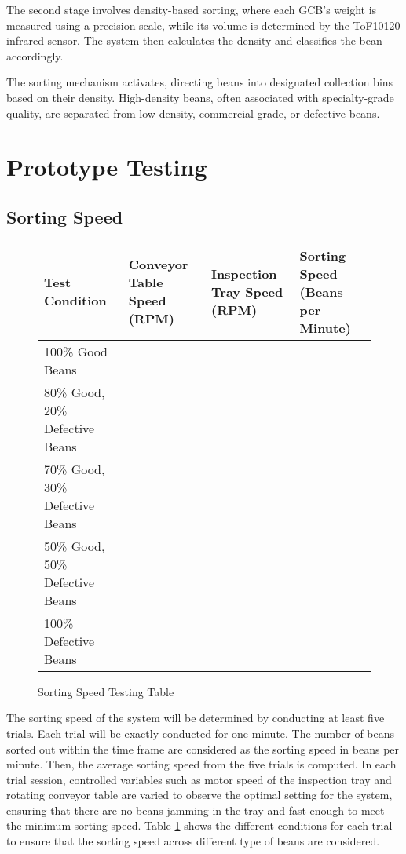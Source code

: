 The second stage involves density-based sorting, where each GCB's weight is measured using a precision scale, while its volume is determined by the ToF10120 infrared sensor. The system then calculates the density and classifies the bean accordingly. 

The sorting mechanism activates, directing beans into designated collection bins based on their density. High-density beans, often associated with specialty-grade quality, are separated from low-density, commercial-grade, or defective beans. 

\section{Prototype Testing}

\subsection{Sorting Speed}

\begin{figure}[H]
	\centering
	\begin{tabularx}{\textwidth}{p{}|p{}|p{}|p{}}
		\caption{Sorting Speed Testing Table} \label{tab:sorting_speed} \\
		\hline \hline
		\textbf{Test Condition} & \textbf{Conveyor Table Speed (RPM)} & \textbf{Inspection Tray Speed (RPM)} & \textbf{Sorting Speed (Beans per Minute)} \\
		\hline
		100\% Good Beans &  &  &  \\
		\hline
		80\% Good, 20\% Defective Beans &  &  &  \\
		\hline
		70\% Good, 30\% Defective Beans &  &  &  \\
		\hline
		50\% Good, 50\% Defective Beans &  &  &  \\
		\hline
		100\% Defective Beans &  &  &  \\
		\hline
	\end{tabularx}
\end{figure}

The sorting speed of the system will be determined by conducting at least five trials. Each trial will be exactly conducted for one minute. The number of beans sorted out within the time frame are considered as the sorting speed in beans per minute. Then, the average sorting speed from the five trials is computed. In each trial session, controlled variables such as motor speed of the inspection tray and rotating conveyor table are varied to observe the optimal setting for the system, ensuring that there are no beans jamming in the tray and fast enough to meet the minimum sorting speed. Table \ref{tab:sorting_speed} shows the different conditions for each trial to ensure that the sorting speed across different type of beans are considered. 


